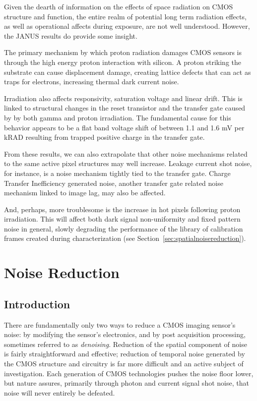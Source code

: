 \documentclass[10pt]{article}
\begin{document}
Given the dearth of information on the effects of space radiation on CMOS structure and function, the entire realm of potential long term radiation effects, as well as operational affects during exposure, are not well understood. However, the JANUS results do provide some insight.

The primary mechanism by which proton radiation damages CMOS sensors is through the high energy proton interaction with silicon. A proton striking the substrate can cause displacement damage, creating lattice defects that can act as traps for electrons, increasing thermal dark current noise. 

Irradiation also affects responsivity, saturation voltage and linear drift. This is linked to structural changes in the reset transistor and the transfer gate caused by by both gamma and proton irradiation. The fundamental cause for this behavior appears to be a flat band voltage shift of between 1.1 and 1.6 mV per kRAD resulting from trapped positive charge in the transfer gate.

From these results, we can also extrapolate that other noise mechanisms related to the same active pixel structures may well increase. Leakage current shot noise, for instance, is a noise mechanism tightly tied to the transfer gate. Charge Transfer Inefficiency generated noise, another transfer gate related noise mechanism linked to image lag, may also be affected.

And, perhaps, more troublesome is the increase in hot pixels following proton irradiation. This will affect both dark signal non-uniformity and fixed pattern noise in general, slowly degrading the performance of the library of calibration frames created during characterization (see Section~\ref{sec:spatialnoisereduction}).

\section{Noise Reduction}
\label{sec:Mitigation}

\subsection{Introduction}

There are fundamentally only two ways to reduce a CMOS imaging sensor's noise: by modifying the sensor's electronics, and by post acquisition processing, sometimes referred to as \emph{denoising}. Reduction of the spatial component of noise is fairly straightforward and effective; reduction of temporal noise generated by the CMOS structure and circuitry is far more difficult and an active subject of investigation. Each generation of CMOS technologies pushes the noise floor lower, but nature assures, primarily through photon and current signal shot noise, that noise will never entirely be defeated.
\end{document}
